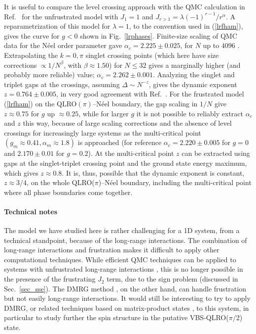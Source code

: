 \documentclass[draft,numberedheadings]{aipproc}
\begin{document}
It is useful to compare the level crossing approach with the QMC calculation in Ref.~\cite{laflorencie} for the 
unfrustrated model with $J_1=1$ and $J_{r>1}=\lambda (-1)^{r-1}/r^\alpha$. A reparametrization of this model for $\lambda=1$, to the convention used in 
(\ref{lrfham}), gives the curve for $g<0$ shown in Fig.~\ref{lrphases}. Finite-size scaling of QMC data for the N\'eel order parameter gave 
$\alpha_c=2.225 \pm 0.025$, for $N$ up to $4096$ \cite{laflorencie} . Extrapolating the $k=0,\pi$ singlet crossing points (which here have size 
corrections $\propto 1/N^{\beta}$, with $\beta\approx 1.50$) for 
$N\le 32$ gives a marginally higher (and probably more reliable) value; $\alpha_c=2.262 \pm 0.001$. Analyzing the singlet and triplet gaps at the crossings, 
assuming $\Delta \sim N^{-z}$, gives the dynamic exponent $z=0.764 \pm 0.005$, in very good agreement with Ref.~\cite{laflorencie}. For the frustrated model 
(\ref{lrfham}) on the QLRO$(\pi)$--N\'eel boundary, the gap scaling in $1/N$ give $z\approx 0.75$ for $g$ up $\approx 0.25$, while for larger $g$ it is not 
possible to reliably extract $\alpha_c$ and $z$ this way, because of large scaling corrections and the absence of level crossings for increasingly large 
systems as the multi-critical point $(g_m\approx 0.41,\alpha_m \approx 1.8)$ is approached (for reference $\alpha_c = 2.220 \pm 0.005$ for $g=0$ and 
$2.170 \pm 0.01$ for $g=0.2$). At the multi-critical point $z$ can be extracted using gaps at the singlet-triplet crossing point and the ground state energy 
maximum, which gives $z\approx 0.8$. It is, thus, possible that the dynamic exponent is constant, $z\approx 3/4$, on the whole QLRO($\pi$)--N\'eel 
boundary, including the multi-critical point where all phase boundaries come together.

\paragraph{Technical notes}

The model we have studied here is rather challenging for a 1D system, from a technical standpoint, because of the long-range interactions. 
The combination of long-range interactions and frustration makes it difficult to apply other computational techniques. While efficient QMC techniques can be 
applied to systems with unfrustrated long-range interactions \cite{awslrqmc,laflorencie}, this is no longer possible in the presence of the frustrating $J_2$ 
term, due to the sign problem (discussed in Sec.~\ref{sec_sse}). The DMRG method \cite{white1,schollwock2}, on the other hand, can handle frustration but not 
easily long-range interactions. It would still be interesting to try to apply DMRG, or related techniques based on matrix-product states \cite{verstraete1}, 
to this system, in particular to study further the spin structure in the putative VBS-QLRO($\pi/2$) state.
\end{document}
